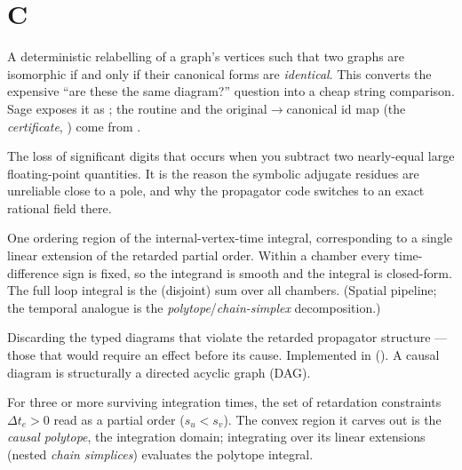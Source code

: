 \section*{C}
\begin{description}[leftmargin=0pt,style=nextline]

  \item[Canonical form / canonical label] A deterministic relabelling of a graph's
        vertices such that two graphs are isomorphic if and only if their canonical
        forms are \emph{identical}. This converts the expensive ``are these the
        same diagram?'' question into a cheap string comparison. Sage exposes it as
        ; the routine and the original$\to$canonical
        id map (the \emph{certificate}, ) come from .

  \item[Catastrophic cancellation] The loss of significant digits that occurs when
        you subtract two nearly-equal large floating-point quantities. It is the
        reason the symbolic adjugate residues are unreliable close to a pole, and
        why the propagator code switches to an exact rational field there.

  \item[Causal chamber / chamber] One ordering region of the internal-vertex-time
        integral, corresponding to a single linear extension of the retarded
        partial order. Within a chamber every time-difference sign is fixed, so the
        integrand is smooth and the integral is closed-form. The full loop integral
        is the (disjoint) sum over all chambers. (Spatial pipeline; the temporal
        analogue is the \emph{polytope}/\emph{chain-simplex} decomposition.)

  \item[Causal filtering] Discarding the typed diagrams that violate the retarded
        \msrjd{} propagator structure --- those that would require an effect before
        its cause. Implemented in 
        (). A causal diagram is structurally
        a directed acyclic graph (DAG).

  \item[Causal poset / causal polytope] For three or more surviving integration
        times, the set of retardation constraints $\Delta t_e > 0$ read as a
        partial order ($s_u < s_v$). The convex region it carves out is the
        \emph{causal polytope}, the integration domain; integrating over its
        linear extensions (nested \emph{chain simplices}) evaluates the polytope
        integral.


\end{description}
